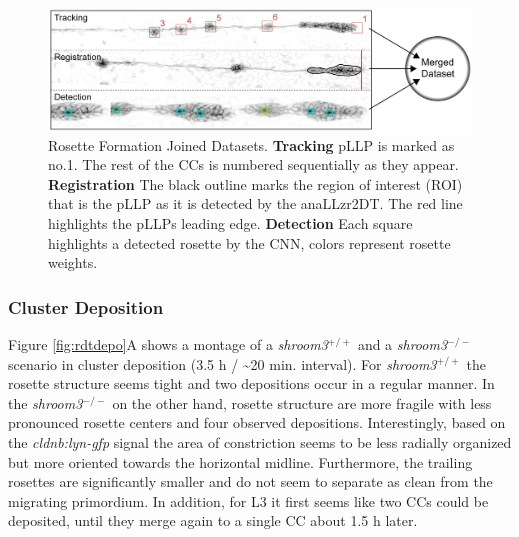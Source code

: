 \documentclass[11pt,singlespacinge,twoside]{reedthesis} %
\theoremstyle{definition}
\theoremstyle{definition}
\theoremstyle{definition}
\theoremstyle{remark}
\begin{document}
\begin{figure}[H]

{\centering \includegraphics[width=0.85\linewidth]{figures/results/03_rosettes/RDT-01} 

}

\caption[Rosette Formation Joined Datasets]{Rosette Formation Joined Datasets. \textbf{Tracking} pLLP is marked as no.1. The rest of the CCs is numbered sequentially as they appear. \textbf{Registration} The black outline marks the region of interest (ROI) that is the pLLP as it is detected by the anaLLzr2DT. The red line highlights the pLLPs leading edge. \textbf{Detection} Each square highlights a detected rosette by the CNN, colors represent rosette weights.}\label{fig:rdt}
\end{figure}
\hypertarget{cluster-deposition}{%
\subsubsection{Cluster Deposition}\label{cluster-deposition}}

Figure \ref{fig:rdtdepo}A shows a montage of a \emph{shroom3}\(^{+/+}\) and a \emph{shroom3}\(^{-/-}\) scenario in cluster deposition (3.5 h / \textasciitilde20 min. interval). For \emph{shroom3}\(^{+/+}\) the rosette structure seems tight and two depositions occur in a regular manner. In the \emph{shroom3}\(^{-/-}\) on the other hand, rosette structure are more fragile with less pronounced rosette centers and four observed depositions. Interestingly, based on the \emph{cldnb:lyn-gfp} signal the area of constriction seems to be less radially organized but more oriented towards the horizontal midline. Furthermore, the trailing rosettes are significantly smaller and do not seem to separate as clean from the migrating primordium. In addition, for L3 it first seems like two CCs could be deposited, until they merge again to a single CC about 1.5 h later.
\end{document}
